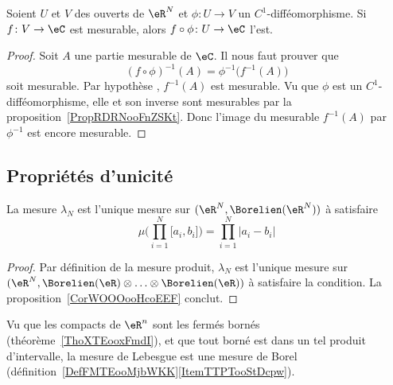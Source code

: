 \begin{proposition}
	Soient \( U\) et \( V\) des ouverts de \( \eR^N\) et \( \phi\colon U\to V\) un \( C^1\)-difféomorphisme. Si \( f\colon V\to \eC\) est mesurable, alors \(f\circ \phi\colon U\to \eC\) l'est.
\end{proposition}

\begin{proof}
	Soit \( A\) une partie mesurable de \( \eC\). Il nous faut prouver que
	\begin{equation}
		(f\circ\phi)^{-1}(A)=\phi^{-1}\big( f^{-1}(A) \big)
	\end{equation}
	soit mesurable. Par hypothèse , \( f^{-1}(A)\) est mesurable. Vu que \( \phi\) est un \( C^1\)-difféomorphisme, elle et son inverse sont mesurables par la proposition~\ref{PropRDRNooFnZSKt}. Donc l'image du mesurable \( f^{-1}(A)\) par \( \phi^{-1}\) est encore mesurable.
\end{proof}

\subsection{Propriétés d'unicité}

\begin{corollary}       \label{CorMPDAooDJRrom}
	La mesure \( \lambda_N\) est l'unique mesure sur \(   (\eR^N,  \Borelien(\eR^N) )   \) à satisfaire
	\begin{equation}
		\mu\big( \prod_{i=1}^N\mathopen[ a_i , b_i \mathclose] \big)=\prod_{i=1}^N| a_i-b_i |
	\end{equation}
\end{corollary}

\begin{proof}
	Par définition de la mesure produit, \( \lambda_N\) est l'unique mesure sur \(   (\eR^N,  \Borelien(\eR)\otimes\ldots\otimes\Borelien(\eR) )   \) à satisfaire la condition. La proposition~\ref{CorWOOOooHcoEEF} conclut.
\end{proof}

Vu que les compacts de \( \eR^n\) sont les fermés bornés (théorème~\ref{ThoXTEooxFmdI}), et que tout borné est dans un tel produit d'intervalle, la mesure de Lebesgue est une mesure de Borel (définition~\ref{DefFMTEooMjbWKK}\ref{ItemTTPTooStDcpw}).

